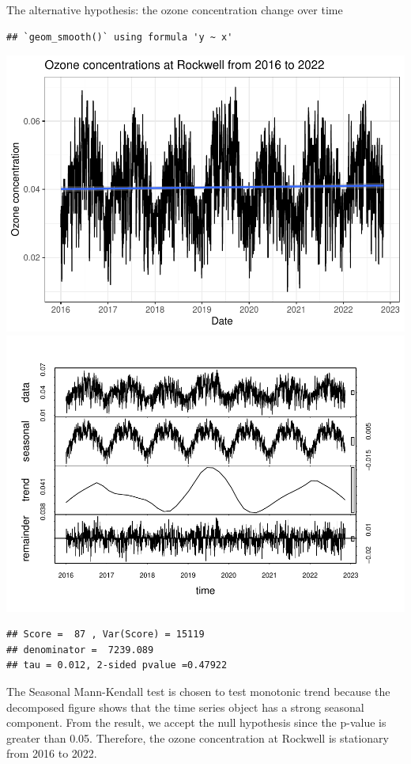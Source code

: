 \documentclass[
  12pt,
]{article}
\begin{document}
The alternative hypothesis: the ozone concentration change over time

\begin{verbatim}
## `geom_smooth()` using formula 'y ~ x'
\end{verbatim}

\includegraphics{Project_DataAnalysis_files/figure-latex/Q5 Time series analysis-1.pdf}
\includegraphics{Project_DataAnalysis_files/figure-latex/Q5 Time series analysis-2.pdf}

\begin{verbatim}
## Score =  87 , Var(Score) = 15119
## denominator =  7239.089
## tau = 0.012, 2-sided pvalue =0.47922
\end{verbatim}

The Seasonal Mann-Kendall test is chosen to test monotonic trend because
the decomposed figure shows that the time series object has a strong
seasonal component. From the result, we accept the null hypothesis since
the p-value is greater than 0.05. Therefore, the ozone concentration at
Rockwell is stationary from 2016 to 2022.
\end{document}
